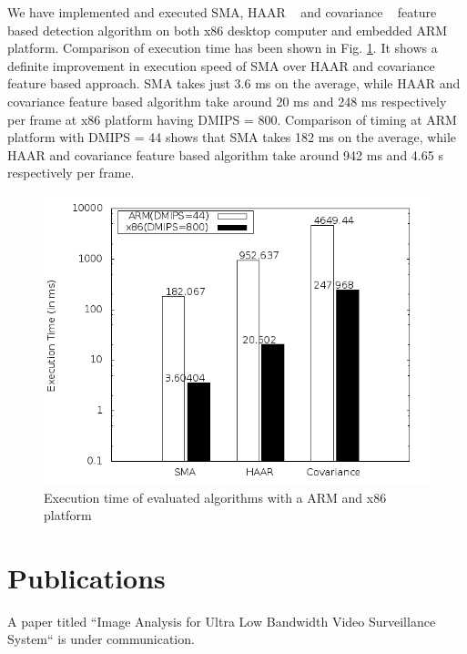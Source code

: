 \documentclass[a4paper, 12pt, twoside]{synopsis}  %
\begin{document}
\indent We have implemented and executed SMA, HAAR ~\cite{2} and
covariance ~\cite{14} feature based detection algorithm on both x86
desktop computer and embedded ARM platform. Comparison of execution time
has been shown in Fig.  \ref{pipeline_execution_time}. It shows a
definite improvement in execution speed of SMA over HAAR and covariance
feature based approach.  SMA takes just 3.6 ms on the average, while
HAAR and covariance feature based algorithm take around 20 ms and 248 ms
respectively per frame at x86 platform having DMIPS = 800. Comparison of
timing at ARM platform with DMIPS = 44 shows that SMA takes 182 ms
on the average, while HAAR and covariance feature based algorithm take
around 942 ms and 4.65 s respectively per frame.  \\
\begin{figure}[!h]
\centering
\includegraphics[scale=0.30]{Figures/pipeline_execution_time}
\caption{Execution time of evaluated algorithms with a ARM and x86
platform}
\label{pipeline_execution_time}
\end{figure}
\section {Publications}
\indent A paper titled ``Image Analysis for Ultra Low Bandwidth Video
Surveillance System`` is under communication.\\

\label{Bibliography}

\cleardoublepage
\end{document}
